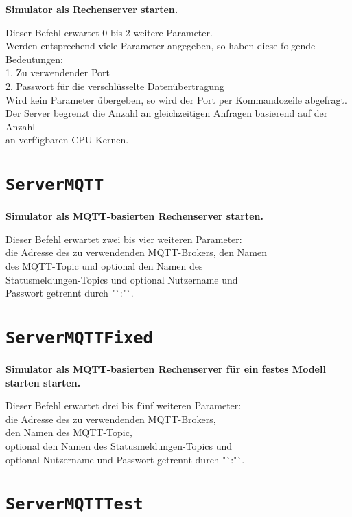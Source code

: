 \textbf{Simulator als Rechenserver starten.}

Dieser Befehl erwartet 0 bis 2 weitere Parameter.\\
Werden entsprechend viele Parameter angegeben, so haben diese folgende Bedeutungen:\\
1. Zu verwendender Port\\
2. Passwort für die verschlüsselte Datenübertragung\\
Wird kein Parameter übergeben, so wird der Port per Kommandozeile abgefragt.\\
Der Server begrenzt die Anzahl an gleichzeitigen Anfragen basierend auf der Anzahl\\
an verfügbaren CPU-Kernen.

\section{\texttt{ServerMQTT}}

\textbf{Simulator als MQTT-basierten Rechenserver starten.}

Dieser Befehl erwartet zwei bis vier weiteren Parameter:\\
die Adresse des zu verwendenden MQTT-Brokers, den Namen\\
des MQTT-Topic und optional den Namen des\\
Statusmeldungen-Topics und optional Nutzername und\\
Passwort getrennt durch "`:"`.

\section{\texttt{ServerMQTTFixed}}

\textbf{Simulator als MQTT-basierten Rechenserver für ein festes Modell starten starten.}

Dieser Befehl erwartet drei bis fünf weiteren Parameter:\\
die Adresse des zu verwendenden MQTT-Brokers,\\
den Namen des MQTT-Topic,\\
optional den Namen des Statusmeldungen-Topics und \\
optional Nutzername und Passwort getrennt durch "`:"`.

\section{\texttt{ServerMQTTTest}}

